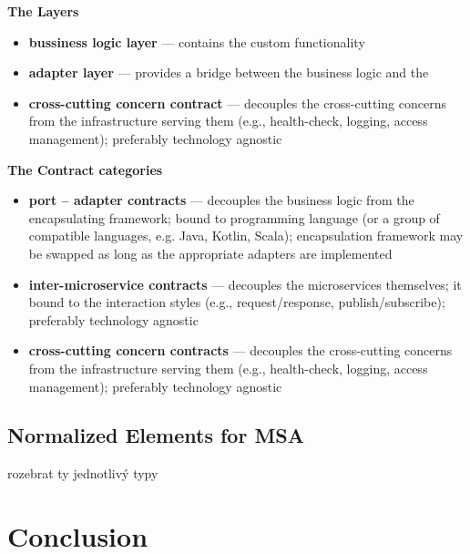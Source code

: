 \documentclass[thesis=M,english,hidelinks]{FITthesis}[2012/10/20]
\begin{document}
\noindent
\textbf{The Layers}
\begin{itemize}[topsep=0.5em]
    \item \textbf{bussiness logic layer} --- contains the custom functionality 
    \item \textbf{adapter layer} --- provides a bridge between the business logic and the 
    \item \textbf{cross-cutting concern contract} --- decouples the cross-cutting concerns from the infrastructure serving them (e.g., health-check, logging, access management); preferably technology agnostic
\end{itemize}
\break
\noindent
\textbf{The Contract categories}
\begin{itemize}[topsep=0.5em]
    \item \textbf{port -- adapter contracts} --- decouples the business logic from the encapsulating framework; bound to programming language (or a group of compatible languages, e.g. Java, Kotlin, Scala); encapsulation framework may be swapped as long as the appropriate adapters are implemented
    \item \textbf{inter-microservice contracts} --- decouples the microservices themselves; it bound to the interaction styles (e.g., request/response, publish/subscribe); preferably technology agnostic
    \item \textbf{cross-cutting concern contracts} --- decouples the cross-cutting concerns from the infrastructure serving them (e.g., health-check, logging, access management); preferably technology agnostic
\end{itemize}




\section{Normalized Elements for MSA}
\label{sec:msa-nor-elem}

rozebrat ty jednotlivý typy




% 
% 
\chapter{Conclusion}
\label{sec:conclusion}
\end{document}

